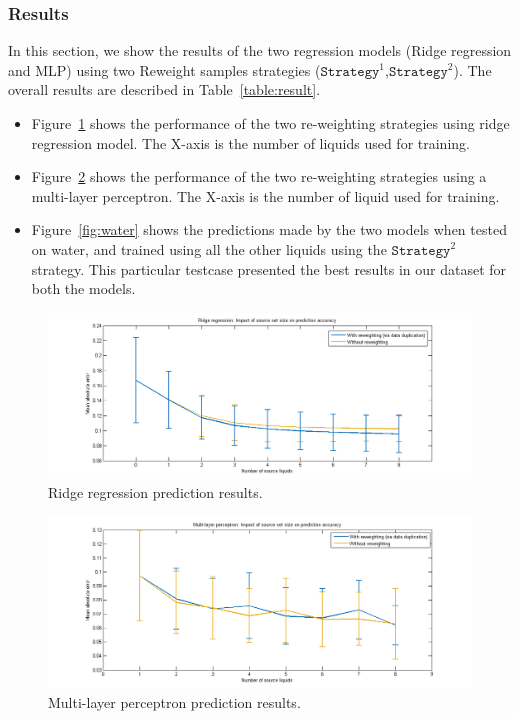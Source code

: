 \documentclass{article} %
\begin{document}
\subsubsection{Results}
In this section, we show the results of the two regression models (Ridge regression and MLP) using two Reweight samples strategies ($\mathtt{Strategy}^1$,$\mathtt{Strategy}^2$). The overall results are described in Table~\ref{table:result}.

\begin{itemize}
\item Figure~\ref{fig:ridge} shows the performance of the two re-weighting strategies using ridge regression model. The X-axis is the number of liquids used for training.

\item Figure~\ref{fig:nn} shows the performance of the two re-weighting strategies using a multi-layer perceptron. The X-axis is the number of liquid used for training.

\item Figure~\ref{fig:water} shows the predictions made by the two models when tested on water, and trained using all the other liquids using the $\mathtt{Strategy}^2$ strategy. This particular testcase presented the best results in our dataset for both the models.
\end{itemize}


\begin{figure}[htb]
\centering
\includegraphics[width=\linewidth]{source_set_size_ridge.png}
\caption{Ridge regression prediction results.}
\label{fig:ridge}
\end{figure}

\begin{figure}[htb]
\centering
\includegraphics[width=\linewidth]{source_set_size_nn.png}
\caption{Multi-layer perceptron prediction results.}
\label{fig:nn}
\end{figure}
\end{document}
